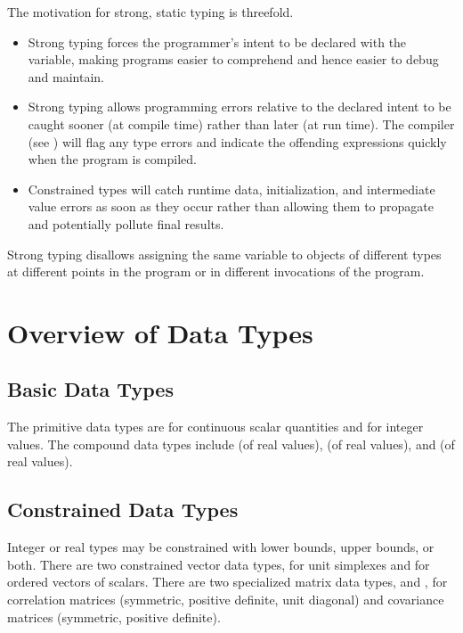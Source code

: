 The motivation for strong, static typing is threefold.  
%
\begin{itemize}
\item Strong typing forces the programmer's intent to be declared with
  the variable, making programs easier to comprehend and hence easier
  to debug and maintain.
\item Strong typing allows programming errors relative to the
  declared intent to be caught sooner (at compile time) rather than
  later (at run time).  The \Stan compiler (see )
  will flag any type errors and indicate the offending expressions
  quickly when the program is compiled.
\item Constrained types will catch runtime data, initialization, and
  intermediate value errors as soon as they occur rather than allowing
  them to propagate and potentially pollute final results.
\end{itemize}
%
Strong typing disallows assigning the same variable to objects of
different types at different points in the program or in different
invocations of the program.

\section{Overview of Data Types}

\subsection{Basic Data Types}

The primitive \Stan data types are  for continuous scalar
quantities and  for integer values.  The compound data
types include  (of real values),  (of
real values), and  (of real values).

\subsection{Constrained Data Types}

Integer or real types may be constrained with lower bounds, upper
bounds, or both.  There are two constrained vector data types,
 for unit simplexes and  for ordered
vectors of scalars.  There are two specialized matrix data types,
 and , for correlation matrices
(symmetric, positive definite, unit diagonal) and covariance matrices
(symmetric, positive definite).

